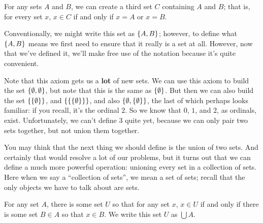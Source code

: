 \begin{axiom}[Pairing]\label{axiom:pairing}
    For any sets $A$ and $B$, we can create a third set $C$ containing $A$ and $B$; that is, for every set $x$, $x \in C$ if and only if $x = A$ or $x = B$.
\end{axiom}

Conventionally, we might write this set as ${\left\{ {A, B} \right\}}$; however, to define what ${\left\{ {A, B} \right\}}$ means we first need to ensure that it really is a set at all.
However, now that we've defined it, we'll make free use of the notation because it's quite convenient.

Note that this axiom gets us a \textbf{lot} of new sets.
We can use this axiom to build the set ${\left\{ {\emptyset, \emptyset} \right\}}$, but note that this is the same as ${\left\{ {\emptyset} \right\}}$.
But then we can also build the set ${\left\{ {{\left\{ {\emptyset} \right\}}} \right\}}$, and ${\left\{ {{\left\{ {{\left\{ {\emptyset} \right\}}} \right\}}} \right\}}$, and also ${\left\{ {\emptyset, {\left\{ {\emptyset} \right\}}} \right\}}$, the last of which perhaps looks familiar: if you recall, it's the ordinal $2$.
So we know that $0$, $1$, and $2$, as ordinals, exist.
Unfortunately, we can't define $3$ quite yet, because we can only pair two sets together, but not union them together.

You may think that the next thing we should define is the union of two sets.
And certainly that would resolve a lot of our problems, but it turns out that we can define a much more powerful operation: unioning every set in a collection of sets.
Here when we say a ``collection of sets'', we mean a set of sets; recall that the only objects we have to talk about are sets.

\begin{axiom}[Unions]\label{axiom:union}
    For any set $A$, there is some set $U$ so that for any set $x$, $x \in U$ if and only if there is some set $B \in A$ so that $x \in B$.
    We write this set $U$ as $\bigcup A$.
\end{axiom}


